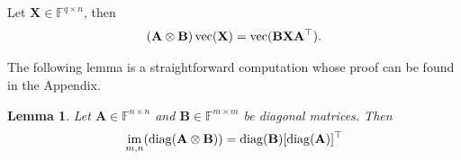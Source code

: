 \documentclass[10pt]{article}  	%
\newtheorem{lemma}[theorem]{Lemma}
\theoremstyle{definition}
\theoremstyle{definition}
\newcommand{\F}{{\mathbb{F}}}
\newcommand{\diag}{{\rm{diag}}}
\DeclareMathOperator*{\vecc}{{\rm{vec}}}
\DeclareMathOperator*{\im}{{\rm{im}}}
\newcommand{\mA}{\mathbf{A}}
\newcommand{\mB}{\mathbf{B}}
\newcommand{\mC}{\mathbf{C}}
\newcommand{\mD}{\mathbf{D}}
\newcommand{\mX}{\mathbf{X}}
\theoremstyle{remark}
\begin{document}
Let $\mX\in\F^{q\times n}$, then
\begin{equation}\label{equ:vec}
(\mA\otimes \mB)\vecc(\mX)=\vecc(\mB\mX\mA^\top).
\end{equation}

%
%    
%    
%    

The following lemma is a straightforward computation whose proof can be found in the Appendix.
\begin{lemma}\label{lem}
Let $\mA\in\mathbb{F}^{n\times n}$ and  $\mB\in\mathbb{F}^{m\times m}$ be diagonal matrices. Then
\begin{equation}\label{equ:lem}
\im_{m, n}(\diag(\mA\otimes \mB))=\diag(\mB)[\diag(\mA)]^\top
\end{equation}
\end{lemma}




\end{document}
